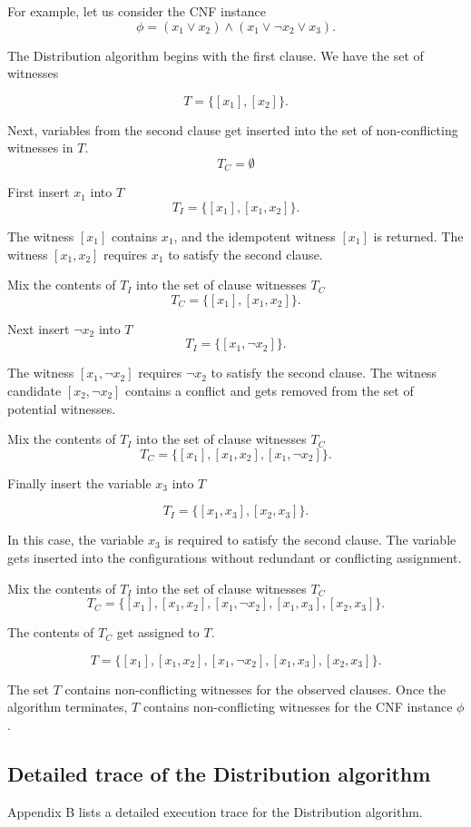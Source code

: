 For example, let us consider the CNF instance
\[
\phi = (x_1 \vee x_2) \wedge (x_1 \vee \neg x_2 \vee x_3).
\]		

The Distribution algorithm begins with the first clause.  We have the set of witnesses

\[
T = \{ [x_1], [x_2] \}.
\] 

Next, variables from the second clause get inserted into the set of non-conflicting witnesses in $T$.
\[
T_C = \emptyset
\]

\noindent First insert $x_1$ into $T$
\[
T_I = \{ [x_1], [x_1, x_2] \}.
\] 

\noindent The witness $[x_1]$ contains $x_1$, and the idempotent witness $[x_1]$ is returned.  The witness $[x_1, x_2]$ requires $x_1$ to satisfy the second clause.

Mix the contents of $T_I$ into the set of clause witnesses $T_C$
\[
T_C = \{ [x_1], [x_1, x_2] \}.
\]

\noindent Next insert $\neg x_2$ into $T$
\[
T_I = \{ [x_1, \neg x_2] \}.
\] 

\noindent The witness $[x_1, \neg x_2]$ requires $\neg x_2$ to satisfy the second clause.  The witness candidate $[x_2, \neg x_2]$ contains a conflict and gets removed from the set of potential witnesses.

Mix the contents of $T_I$ into the set of clause witnesses $T_C$
\[
T_C = \{ [x_1], [x_1, x_2], [x_1, \neg x_2] \}.
\]


Finally insert the variable $x_3$ into $T$

\[
T_I = \{ [x_1, x_3], [x_2, x_3] \}.
\] 

\noindent In this case, the variable $x_3$ is required to satisfy the second clause.  The variable gets inserted into the configurations without redundant or conflicting assignment.

Mix the contents of $T_I$ into the set of clause witnesses $T_C$
\[
T_C = \{ [x_1], [x_1, x_2], [x_1, \neg x_2], [x_1, x_3], [x_2, x_3] \}.
\]

The contents of $T_C$ get assigned to $T$.

\[
T = \{ [x_1], [x_1, x_2], [x_1, \neg x_2], [x_1, x_3], [x_2, x_3] \}.
\]

The set $T$ contains non-conflicting witnesses for the observed clauses.  Once the algorithm terminates, $T$ contains non-conflicting witnesses for the CNF instance $\phi$. 
	
	\subsection{Detailed trace of the Distribution algorithm}

Appendix B lists a detailed execution trace for the Distribution algorithm.


%
%
%	


